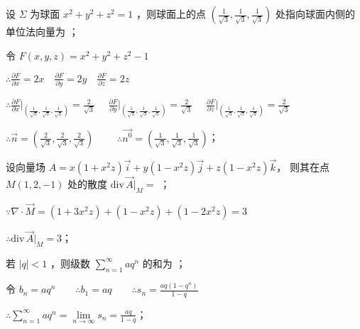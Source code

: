 \begin{question}[points = 3]
    设 $\Sigma$ 为球面 $x^2 + y^2 + z^2 = 1$ ，则球面上的点 $\left(\frac{1}{\sqrt{3}}, \frac{1}{\sqrt{3}}, \frac{1}{\sqrt{3}}\right)$
    处指向球面内侧的单位法向量为 ；
\end{question}
\begin{solution}
    令 $F(x, y, z) = x^2 + y^2 + z^2 - 1$

    $\therefore \frac{\partial F}{\partial x} = 2x \quad \frac{\partial F}{\partial y} = 2y \quad \frac{\partial F}{\partial z} = 2z$

    $\therefore \frac{\partial F}{\partial x}|_{\left(\frac{1}{\sqrt{3}}, \frac{1}{\sqrt{3}}, \frac{1}{\sqrt{3}}\right)} = \frac{2}{\sqrt{3}} \quad$
    $\frac{\partial F}{\partial y}|_{\left(\frac{1}{\sqrt{3}}, \frac{1}{\sqrt{3}}, \frac{1}{\sqrt{3}}\right)} = \frac{2}{\sqrt{3}}$
    $\quad \frac{\partial F}{\partial z}|_{\left(\frac{1}{\sqrt{3}}, \frac{1}{\sqrt{3}}, \frac{1}{\sqrt{3}}\right)} = \frac{2}{\sqrt{3}}$

    $\therefore \vec{n} = \left(\frac{2}{\sqrt{3}}, \frac{2}{\sqrt{3}}, \frac{2}{\sqrt{3}}\right) \qquad$
    $\therefore \vec{n^0} = \left(\frac{1}{\sqrt{3}}, \frac{1}{\sqrt{3}}, \frac{1}{\sqrt{3}}\right)$；
\end{solution}

\begin{question}[points = 3]
    设向量场 $A = x(1 + x^2z)\vec{i} + y(1 - x^2z)\vec{j} + z(1 - x^2z)\vec{k}$，
    则其在点 $M(1, 2, -1)$ 处的散度 $\mathrm{div} \, \vec{A}|_M = $ \fillin[3]；
\end{question}
\begin{solution}
    $\because \nabla\cdot\vec{M} = (1 + 3x^2z) + (1-x^2z) + (1-2x^2z) = 3$

    $\therefore \mathrm{div} \, \vec{A}|_M = 3$；
\end{solution}

\begin{question}[points = 3]
    若 $|q| < 1$ ，则级数 $\sum\limits_{n = 1}^{\infty} aq^n$ 的和为 \fillin[$\frac{aq}{1 - q}$]；
\end{question}
\begin{solution}
    令 $b_n = aq^n \qquad \therefore b_1 = aq \qquad \therefore s_n = \frac{aq(1 - q^n)}{1 - q}$

    $\therefore \sum\limits_{n = 1}^{\infty} aq^n = \lim\limits_{n \to \infty} s_n = \frac{aq}{1 - q}$；
\end{solution}

